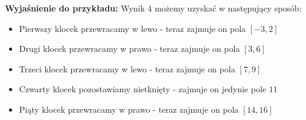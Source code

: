 \documentclass[zad,zawodnik,utf8]{sinol}
\begin{document}
\begin{tasktext}
\hspace{1cm} \textbf{\newline Wyjaśnienie do przykładu:} Wynik 4 możemy uzyskać w następujący sposób: 
\begin{itemize}
	\item Pierwszy klocek przewracamy w lewo  - teraz zajmuje on pola $[-3, 2]$
	\item Drugi klocek przewracamy w prawo - teraz zajmuje on pola $[3, 6]$
	\item Trzeci klocek przewracamy w lewo - teraz zajmuje on pola $[7, 9]$
	\item Czwarty klocek pozostawiamy nietknięty - zajmuje on jedynie pole $11$
	\item Piąty klocek przewracamy w prawo - teraz zajmuje on pola $[14, 16]$
\end{itemize}
\end{tasktext}
\end{document}
